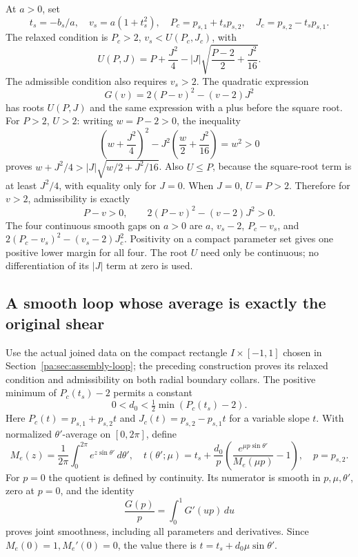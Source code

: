 \documentclass[10pt,a4paper]{article}
\begin{document}
At \(a>0\), set \[
t_s=-b_s/a,\quad v_s=a(1+t_s^2),\quad
P_c=p_{s,1}+t_sp_{s,2},\quad
J_c=p_{s,2}-t_sp_{s,1}.
\] The relaxed condition is \(P_c>2\), \(v_s<U(P_c,J_c)\), with \[
U(P,J)=P+\frac{J^2}{4}
-|J|\sqrt{\frac{P-2}{2}+\frac{J^2}{16}}.
\] The admissible condition also requires \(v_s>2\). The quadratic expression \[
G(v)=2(P-v)^2-(v-2)J^2
\] has roots \(U(P,J)\) and the same expression with a plus before the square root. For \(P>2\), \(U>2\): writing \(w=P-2>0\), the inequality \[
\left(w+\frac{J^2}{4}\right)^2
-J^2\left(\frac w2+\frac{J^2}{16}\right)=w^2>0
\] proves \(w+J^2/4>|J|\sqrt{w/2+J^2/16}\). Also \(U\le P\), because the square-root term is at least \(J^2/4\), with equality only for \(J=0\). When \(J=0\), \(U=P>2\). Therefore for \(v>2\), admissibility is exactly \[
P-v>0,\qquad 2(P-v)^2-(v-2)J^2>0.
\] The four continuous smooth gaps on \(a>0\) are \(a\), \(v_s-2\), \(P_c-v_s\), and \(2(P_c-v_s)^2-(v_s-2)J_c^2\). Positivity on a compact parameter set gives one positive lower margin for all four. The root \(U\) need only be continuous; no differentiation of its \(|J|\) term at zero is used.

\subsection{A smooth loop whose average is exactly the original shear}\label{pa:a-smooth-loop-whose-average-is-exactly-the-original-shear}

Use the actual joined data on the compact rectangle \(I\times[-1,1]\) chosen in Section~\ref{pa:sec:assembly-loop}; the preceding construction proves its relaxed condition and admissibility on both radial boundary collars. The positive minimum of \(P_c(t_s)-2\) permits a constant \[
0<d_0<\tfrac12\min(P_c(t_s)-2).
\] Here \(P_c(t)=p_{s,1}+p_{s,2}t\) and \(J_c(t)=p_{s,2}-p_{s,1}t\) for a variable slope \(t\). With normalized \(\theta'\)-average on \([0,2\pi]\), define \[
M_e(z)=\frac1{2\pi}\int_0^{2\pi}e^{z\sin\theta'}\,d\theta',
\quad
t(\theta';\mu)=t_s+
\frac{d_0}{p}\left(\frac{e^{\mu p\sin\theta'}}{M_e(\mu p)}-1\right),
\quad p=p_{s,2}.
\] For \(p=0\) the quotient is defined by continuity. Its numerator is smooth in \(p,\mu,\theta'\), zero at \(p=0\), and the identity \[
\frac{G(p)}p=\int_0^1G'(up)\,du
\] proves joint smoothness, including all parameters and derivatives. Since \(M_e(0)=1,M_e'(0)=0\), the value there is \(t=t_s+d_0\mu\sin\theta'\).
\end{document}
